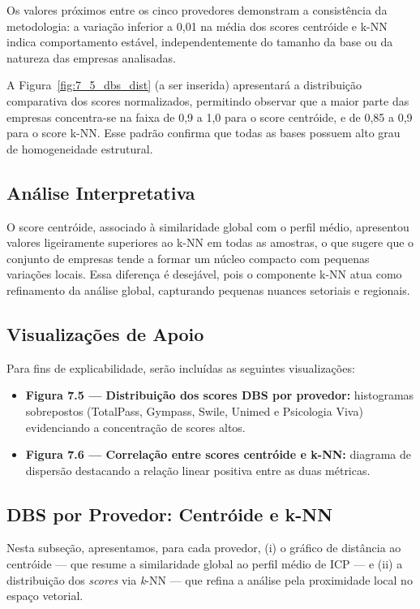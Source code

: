 Os valores próximos entre os cinco provedores demonstram a consistência da metodologia: a variação inferior a 0,01 na média dos scores centróide e k-NN indica comportamento estável, independentemente do tamanho da base ou da natureza das empresas analisadas. 

A Figura~\ref{fig:7_5_dbs_dist} (a ser inserida) apresentará a distribuição comparativa dos scores normalizados, permitindo observar que a maior parte das empresas concentra-se na faixa de 0,9 a 1,0 para o score centróide, e de 0,85 a 0,9 para o score k-NN. Esse padrão confirma que todas as bases possuem alto grau de homogeneidade estrutural.

\subsection{Análise Interpretativa}

O score centróide, associado à similaridade global com o perfil médio, apresentou valores ligeiramente superiores ao k-NN em todas as amostras, o que sugere que o conjunto de empresas tende a formar um núcleo compacto com pequenas variações locais. Essa diferença é desejável, pois o componente k-NN atua como refinamento da análise global, capturando pequenas nuances setoriais e regionais.


\subsection{Visualizações de Apoio}

Para fins de explicabilidade, serão incluídas as seguintes visualizações:

\begin{itemize}
    \item \textbf{Figura 7.5 — Distribuição dos scores DBS por provedor:} histogramas sobrepostos (TotalPass, Gympass, Swile, Unimed e Psicologia Viva) evidenciando a concentração de scores altos.
    \item \textbf{Figura 7.6 — Correlação entre scores centróide e k-NN:} diagrama de dispersão destacando a relação linear positiva entre as duas métricas.
\end{itemize}

\subsection{DBS por Provedor: Centróide e k-NN}

\noindent
Nesta subseção, apresentamos, para cada provedor, (i) o gráfico de distância ao centróide — que resume a similaridade global ao perfil médio de ICP — e (ii) a distribuição dos \textit{scores} via \textit{k}-NN — que refina a análise pela proximidade local no espaço vetorial.


